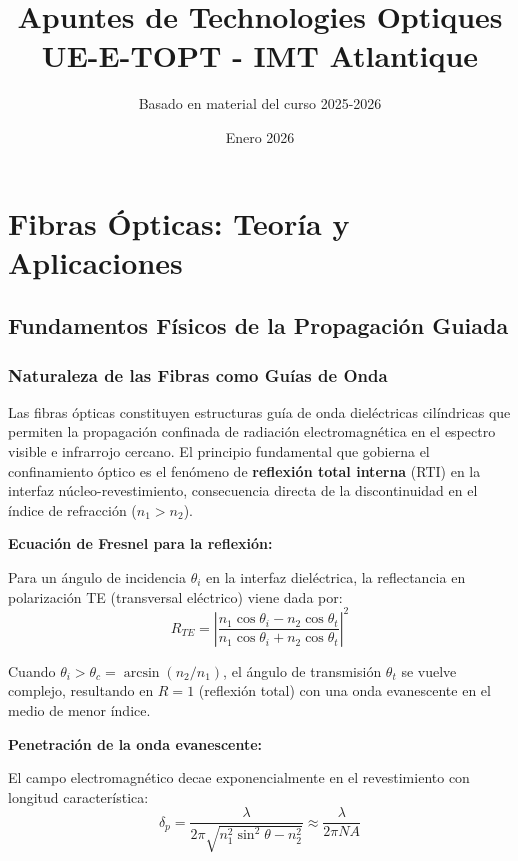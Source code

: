 \documentclass[11pt,a4paper]{article}
\title{\textbf{Apuntes de Technologies Optiques}\\
\large UE-E-TOPT - IMT Atlantique}
\author{Basado en material del curso 2025-2026}
\date{Enero 2026}
\begin{document}
\maketitle
\tableofcontents
\newpage

\section{Fibras Ópticas: Teoría y Aplicaciones}

\subsection{Fundamentos Físicos de la Propagación Guiada}

\subsubsection{Naturaleza de las Fibras como Guías de Onda}

Las fibras ópticas constituyen estructuras guía de onda dieléctricas cilíndricas que permiten la propagación confinada de radiación electromagnética en el espectro visible e infrarrojo cercano. El principio fundamental que gobierna el confinamiento óptico es el fenómeno de \textbf{reflexión total interna} (RTI) en la interfaz núcleo-revestimiento, consecuencia directa de la discontinuidad en el índice de refracción ($n_1 > n_2$).

\textbf{Ecuación de Fresnel para la reflexión:}

Para un ángulo de incidencia $\theta_i$ en la interfaz dieléctrica, la reflectancia en polarización TE (transversal eléctrico) viene dada por:
\begin{equation}
    R_{TE} = \left|\frac{n_1\cos\theta_i - n_2\cos\theta_t}{n_1\cos\theta_i + n_2\cos\theta_t}\right|^2
\end{equation}

Cuando $\theta_i > \theta_c = \arcsin(n_2/n_1)$, el ángulo de transmisión $\theta_t$ se vuelve complejo, resultando en $R = 1$ (reflexión total) con una onda evanescente en el medio de menor índice.

\textbf{Penetración de la onda evanescente:}

El campo electromagnético decae exponencialmente en el revestimiento con longitud característica:
\begin{equation}
    \delta_p = \frac{\lambda}{2\pi\sqrt{n_1^2\sin^2\theta - n_2^2}} \approx \frac{\lambda}{2\pi NA}
\end{equation}
\end{document}
